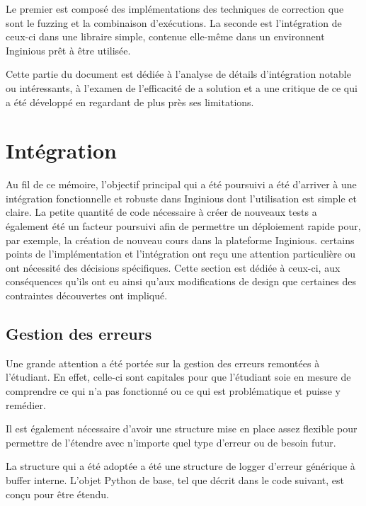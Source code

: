 \documentclass[a4paper]{report}
\begin{document}
Le premier est composé des implémentations des techniques de correction que sont le fuzzing et la combinaison d'exécutions.
La seconde est l'intégration de ceux-ci dans une libraire simple, contenue elle-même dans un environnent Inginious prêt à être utilisée.

Cette partie du document est dédiée à l'analyse de détails d'intégration notable ou intéressants, à l'examen de l'efficacité de a solution et a une critique de ce qui a été développé en regardant de plus près ses limitations.



\section{Intégration}
Au fil de ce mémoire, l'objectif principal qui a été poursuivi a été d'arriver à une intégration fonctionnelle et robuste dans Inginious dont l'utilisation est simple et claire.
La petite quantité de code nécessaire à créer  de nouveaux tests a également été un facteur poursuivi afin de permettre un déploiement rapide pour, par exemple, la création de nouveau cours dans la plateforme Inginious.
certains points de l'implémentation et l'intégration ont reçu une attention particulière ou ont nécessité des décisions spécifiques.
Cette section est dédiée à ceux-ci, aux conséquences qu'ils ont eu ainsi qu'aux modifications de design que certaines des contraintes découvertes ont impliqué.

\subsection{Gestion des erreurs}
Une grande attention a été portée sur la gestion des erreurs remontées à l'étudiant.
En effet, celle-ci sont capitales pour que l'étudiant soie en mesure de comprendre ce qui n'a pas fonctionné ou ce qui est problématique et puisse y remédier.

Il est également nécessaire d'avoir une structure mise en place assez flexible pour permettre de l'étendre avec n'importe quel type d'erreur ou de besoin futur.

La structure qui a été adoptée a été une structure de logger d'erreur générique à buffer interne.
L'objet Python de base, tel que décrit dans le code suivant, est conçu pour être étendu.
\end{document}
